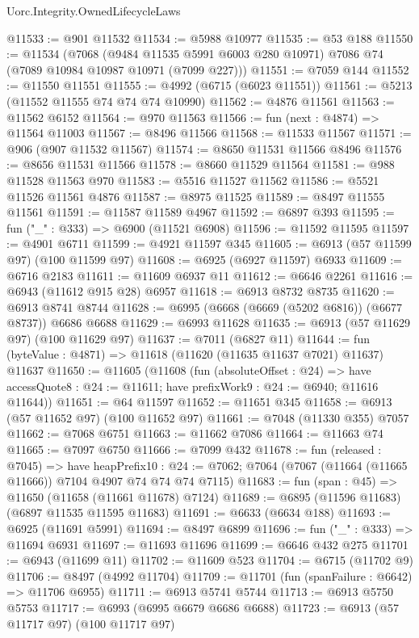\begin{lexlean}{Uorc.Integrity.OwnedLifecycleLaws}
\begin{coremodule}
@11533 := @901 @11532
@11534 := @5988 @10977
@11535 := @53 @188
@11550 := @11534
    (@7068
      (@9484 @11535 @5991 @6003 @280 @10971)
      @7086
      @74
      (@7089 @10984 @10987 @10971 (@7099 @227)))
@11551 := @7059 @144
@11552 := @11550 @11551
@11555 := @4992 (@6715 (@6023 @11551))
@11561 := @5213 (@11552 @11555 @74 @74 @74 @10990)
@11562 := @4876 @11561
@11563 := @11562 @6152
@11564 := @970 @11563
@11566 := fun (next : @4874) => @11564 @11003
@11567 := @8496 @11566
@11568 := @11533 @11567
@11571 := @906 (@907 @11532 @11567)
@11574 := @8650 @11531 @11566 @8496
@11576 := @8656 @11531 @11566
@11578 := @8660 @11529 @11564
@11581 := @988 @11528 @11563 @970
@11583 := @5516 @11527 @11562
@11586 := @5521 @11526 @11561 @4876
@11587 := @8975 @11525
@11589 := @8497 @11555 @11561
@11591 := @11587 @11589 @4967
@11592 := @6897 @393
@11595 := fun ("_" : @333) => @6900 (@11521 @6908)
@11596 := @11592 @11595
@11597 := @4901 @6711
@11599 := @4921 @11597 @345
@11605 := @6913 (@57 @11599 @97) (@100 @11599 @97)
@11608 := @6925 (@6927 @11597) @6933
@11609 := @6716 @2183
@11611 := @11609 @6937 @11
@11612 := @6646 @2261
@11616 := @6943 (@11612 @915 @28) @6957
@11618 := @6913 @8732 @8735
@11620 := @6913 @8741 @8744
@11628 := @6995 (@6668 (@6669 (@5202 @6816)) (@6677 @8737)) @6686 @6688
@11629 := @6993 @11628
@11635 := @6913 (@57 @11629 @97) (@100 @11629 @97)
@11637 := @7011 (@6827 @11)
@11644 := fun (byteValue : @4871) => @11618 (@11620 (@11635 @11637 @7021) @11637) @11637
@11650 := @11605
    (@11608
      (fun (absoluteOffset : @24) =>
      have accessQuote8 : @24 := @11611; have prefixWork9 : @24 := @6940; @11616 @11644))
@11651 := @64 @11597
@11652 := @11651 @345
@11658 := @6913 (@57 @11652 @97) (@100 @11652 @97)
@11661 := @7048 (@11330 @355) @7057
@11662 := @7068 @6751
@11663 := @11662 @7086
@11664 := @11663 @74
@11665 := @7097 @6750
@11666 := @7099 @432
@11678 := fun (released : @7045) =>
  have heapPrefix10 : @24 := @7062;
  @7064 (@7067 (@11664 (@11665 @11666)) @7104 @4907 @74 @74 @74 @7115)
@11683 := fun (span : @45) => @11650 (@11658 (@11661 @11678) @7124)
@11689 := @6895 (@11596 @11683) (@6897 @11535 @11595 @11683)
@11691 := @6633 (@6634 @188)
@11693 := @6925 (@11691 @5991)
@11694 := @8497 @6899
@11696 := fun ("_" : @333) => @11694 @6931
@11697 := @11693 @11696
@11699 := @6646 @432 @275
@11701 := @6943 (@11699 @11)
@11702 := @11609 @523
@11704 := @6715 (@11702 @9)
@11706 := @8497 (@4992 @11704)
@11709 := @11701 (fun (spanFailure : @6642) => @11706 @6955)
@11711 := @6913 @5741 @5744
@11713 := @6913 @5750 @5753
@11717 := @6993 (@6995 @6679 @6686 @6688)
@11723 := @6913 (@57 @11717 @97) (@100 @11717 @97)

\end{coremodule}
\end{lexlean}
